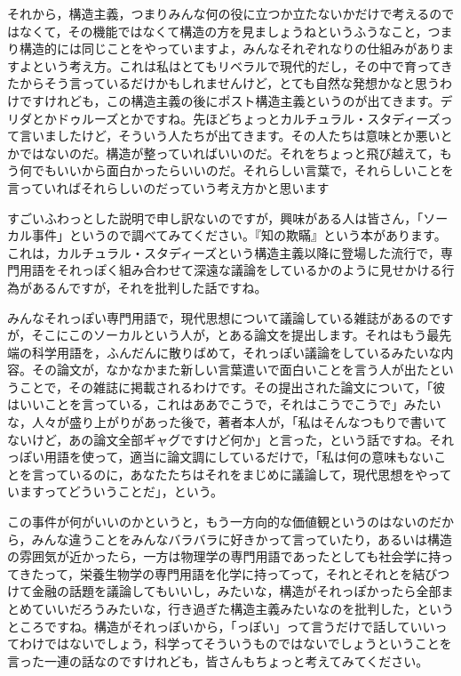 \documentclass{ltjsbook}
\begin{document}
それから，構造主義，つまりみんな何の役に立つか立たないかだけで考えるのではなくて，その機能ではなくて構造の方を見ましょうねというふうなこと，つまり構造的には同じことをやっていますよ，みんなそれぞれなりの仕組みがありますよという考え方。これは私はとてもリベラルで現代的だし，その中で育ってきたからそう言っているだけかもしれませんけど，とても自然な発想かなと思うわけですけれども，この構造主義の後にポスト構造主義というのが出てきます。デリダとかドゥルーズとかですね。先ほどちょっとカルチュラル・スタディーズって言いましたけど，そういう人たちが出てきます。その人たちは意味とか悪いとかではないのだ。構造が整っていればいいのだ。それをちょっと飛び越えて，もう何でもいいから面白かったらいいのだ。それらしい言葉で，それらしいことを言っていればそれらしいのだっていう考え方かと思います

すごいふわっとした説明で申し訳ないのですが，興味がある人は皆さん，「ソーカル事件」というので調べてみてください。『知の欺瞞』という本があります\parencite{chinogiman}。これは，カルチュラル・スタディーズという構造主義以降に登場した流行で，専門用語をそれっぽく組み合わせて深遠な議論をしているかのように見せかける行為があるんですが，それを批判した話ですね。

みんなそれっぽい専門用語で，現代思想について議論している雑誌があるのですが，そこにこのソーカルという人が，とある論文を提出します。それはもう最先端の科学用語を，ふんだんに散りばめて，それっぽい議論をしているみたいな内容。その論文が，なかなかまた新しい言葉遣いで面白いことを言う人が出たということで，その雑誌に掲載されるわけです。その提出された論文について，「彼はいいことを言っている，これはああでこうで，それはこうでこうで」みたいな，人々が盛り上がりがあった後で，著者本人が，「私はそんなつもりで書いてないけど，あの論文全部ギャグですけど何か」と言った，という話ですね。それっぽい用語を使って，適当に論文調にしているだけで，「私は何の意味もないことを言っているのに，あなたたちはそれをまじめに議論して，現代思想をやっていますってどういうことだ」，という。

この事件が何がいいのかというと，もう一方向的な価値観というのはないのだから，みんな違うことをみんなバラバラに好きかって言っていたり，あるいは構造の雰囲気が近かったら，一方は物理学の専門用語であったとしても社会学に持ってきたって，栄養生物学の専門用語を化学に持ってって，それとそれとを結びつけて金融の話題を議論してもいいし，みたいな，構造がそれっぽかったら全部まとめていいだろうみたいな，行き過ぎた構造主義みたいなのを批判した，というところですね。構造がそれっぽいから，「っぽい」って言うだけで話していいってわけではないでしょう，科学ってそういうものではないでしょうということを言った一連の話なのですけれども，皆さんもちょっと考えてみてください。
\end{document}
